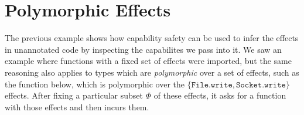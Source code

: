 \documentclass[sigplan,10pt,review]{acmart}\settopmatter{printfolios=true,printccs=false,printacmref=false}
\newcommand{\kwa}[1]{\mathtt{#1}}
\newcommand{\epscalc}{\kwa{CC}}
\begin{document}
%
%
%

\section{Polymorphic Effects}

The previous example shows how capability safety can be used to infer the effects in unannotated code by inspecting the capabilites we pass into it. We saw an example where functions with a fixed set of effects were imported, but the same reasoning also applies to types which are \textit{polymorphic} over a set of effects, such as the function below, which is polymorphic over the $\{ \kwa{File.write, Socket.write} \}$ effects. After fixing a particular subset $\Phi$ of these effects, it asks for a function with those effects and then incurs them.
\end{document}
